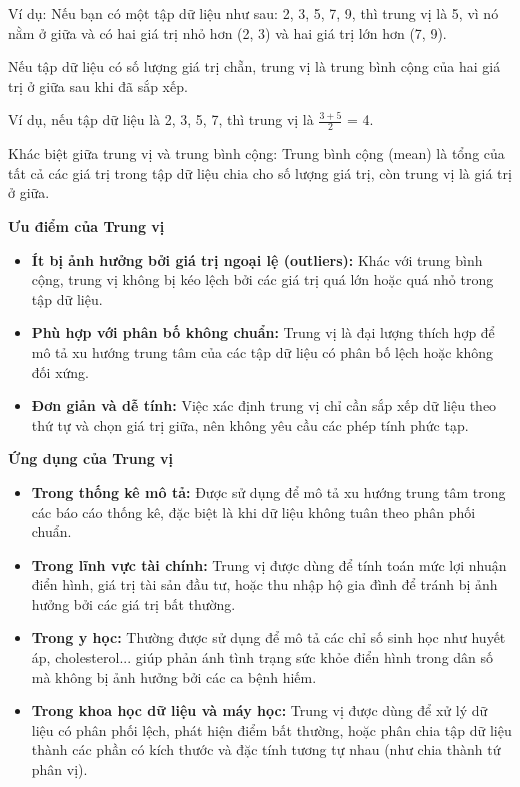 Ví dụ:
Nếu bạn có một tập dữ liệu như sau: 2, 3, 5, 7, 9, thì trung vị là 5, vì nó nằm ở giữa và có hai giá trị nhỏ hơn (2, 3) và hai giá trị lớn hơn (7, 9).

Nếu tập dữ liệu có số lượng giá trị chẵn, trung vị là trung bình cộng của hai giá trị ở giữa sau khi đã sắp xếp. 

Ví dụ, nếu tập dữ liệu là 2, 3, 5, 7, thì trung vị là $\frac{3 + 5}{2}$ = 4.

Khác biệt giữa trung vị và trung bình cộng:
Trung bình cộng (mean) là tổng của tất cả các giá trị trong tập dữ liệu chia cho số lượng giá trị, còn trung vị là giá trị ở giữa.

\textbf{Ưu điểm của Trung vị}
\begin{itemize}[noitemsep, topsep=0pt]
    \item \textbf{Ít bị ảnh hưởng bởi giá trị ngoại lệ (outliers):} Khác với trung bình cộng, trung vị không bị kéo lệch bởi các giá trị quá lớn hoặc quá nhỏ trong tập dữ liệu.
    \item \textbf{Phù hợp với phân bố không chuẩn:} Trung vị là đại lượng thích hợp để mô tả xu hướng trung tâm của các tập dữ liệu có phân bố lệch hoặc không đối xứng.
    \item \textbf{Đơn giản và dễ tính:} Việc xác định trung vị chỉ cần sắp xếp dữ liệu theo thứ tự và chọn giá trị giữa, nên không yêu cầu các phép tính phức tạp.
\end{itemize}

\textbf{Ứng dụng của Trung vị}
\begin{itemize}[noitemsep, topsep=0pt]
    \item \textbf{Trong thống kê mô tả:} Được sử dụng để mô tả xu hướng trung tâm trong các báo cáo thống kê, đặc biệt là khi dữ liệu không tuân theo phân phối chuẩn.
    \item \textbf{Trong lĩnh vực tài chính:} Trung vị được dùng để tính toán mức lợi nhuận điển hình, giá trị tài sản đầu tư, hoặc thu nhập hộ gia đình để tránh bị ảnh hưởng bởi các giá trị bất thường.
    \item \textbf{Trong y học:} Thường được sử dụng để mô tả các chỉ số sinh học như huyết áp, cholesterol... giúp phản ánh tình trạng sức khỏe điển hình trong dân số mà không bị ảnh hưởng bởi các ca bệnh hiếm.
    \item \textbf{Trong khoa học dữ liệu và máy học:} Trung vị được dùng để xử lý dữ liệu có phân phối lệch, phát hiện điểm bất thường, hoặc phân chia tập dữ liệu thành các phần có kích thước và đặc tính tương tự nhau (như chia thành tứ phân vị).
\end{itemize}

